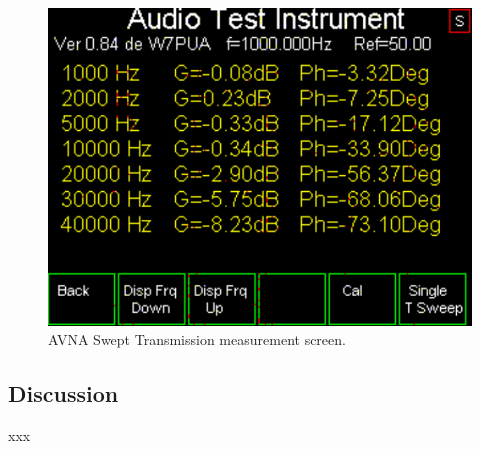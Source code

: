 \begin{figure}[H]
\begin{center}
\includegraphics[scale=0.75]{./images/AVNA_032.pdf}
\caption{AVNA Swept Transmission measurement screen.}
\label{AVNA_032-label}
\end{center}
\end{figure}
%
\subsection{Discussion}
xxx
